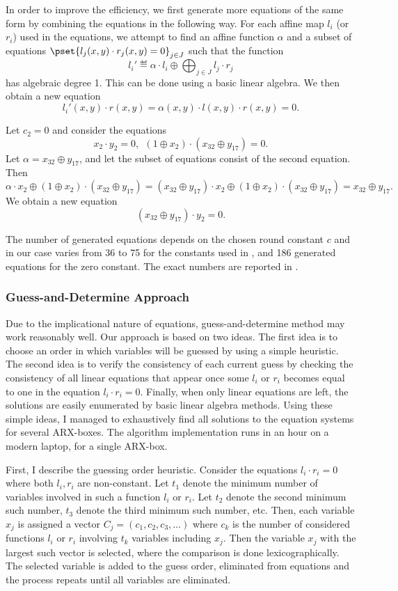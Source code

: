 In order to improve the efficiency, we first generate more equations of the same form by combining the equations in the following way. For each affine map $l_i$ (or $r_i$) used in the equations, we attempt to find an affine function $\alpha$ and a subset of equations $\pset{l_j(x,y)\cdot r_j(x,y) = 0}_{j \in J}$ such that the function
$$
l_i' \eqdef \alpha \cdot l_i \oplus \bigoplus_{j \in J} l_j \cdot r_j
$$
has algebraic degree 1. This can be done using a basic linear algebra. We then obtain a new equation $$
l_i'(x,y) \cdot r(x,y) = \alpha(x,y) \cdot l(x,y) \cdot r(x,y) = 0.
$$
\begin{example}
Let $c_{2} = 0$ and consider the equations
$$
x_2 \cdot y_2 = 0,~~ (1\oplus x_2) \cdot (x_{32} \oplus y_{17}) = 0.
$$
Let $\alpha = x_{32} \oplus y_{17}$, and let the subset of equations consist of the second equation. Then
$$
\alpha \cdot x_2 \oplus (1\oplus x_2) \cdot (x_{32} \oplus y_{17}) = (x_{32} \oplus y_{17}) \cdot x_2 \oplus (1\oplus x_2) \cdot (x_{32} \oplus y_{17}) = x_{32} \oplus y_{17}.
$$
We obtain a new equation
$$
(x_{32} \oplus y_{17})\cdot y_2 = 0.
$$
\end{example}

The number of generated equations depends on the chosen round constant $c$ and in our case varies from 36 to 75 for the constants used in \aCipher, and 186 generated equations for the zero constant. The exact numbers are reported in .

\subsubsection{Guess-and-Determine Approach}

Due to the implicational nature of equations, guess-and-determine method may work reasonably well. Our approach is based on two ideas. The first idea is to choose an order in which variables will be guessed by using a simple heuristic. The second idea is to verify the consistency of each current guess by checking the consistency of all linear equations that appear once some $l_i$ or $r_i$ becomes equal to one in the equation $l_i \cdot r_i = 0$. Finally, when only linear equations are left, the solutions are easily enumerated by basic linear algebra methods. Using these simple ideas, I managed to exhaustively find all solutions to the equation systems for several ARX-boxes. The algorithm implementation runs in an hour on a modern laptop, for a single ARX-box.

First, I describe the guessing order heuristic. Consider the equations $l_i \cdot r_i = 0$ where both $l_i,r_i$ are non-constant. Let $t_1$ denote the minimum number of variables involved in such a function $l_i$ or $r_i$. Let $t_2$ denote the second minimum such number, $t_3$ denote the third minimum such number, etc. Then, each variable $x_j$ is assigned a vector $C_j = (c_1, c_2, c_3, \ldots)$  where $c_k$ is the number of considered functions $l_i$ or $r_i$  involving $t_k$ variables including $x_j$. Then the variable $x_j$ with the largest such vector is selected, where the comparison is done lexicographically. The selected variable is added to the guess order, eliminated from equations and the process repeats until all variables are eliminated.

